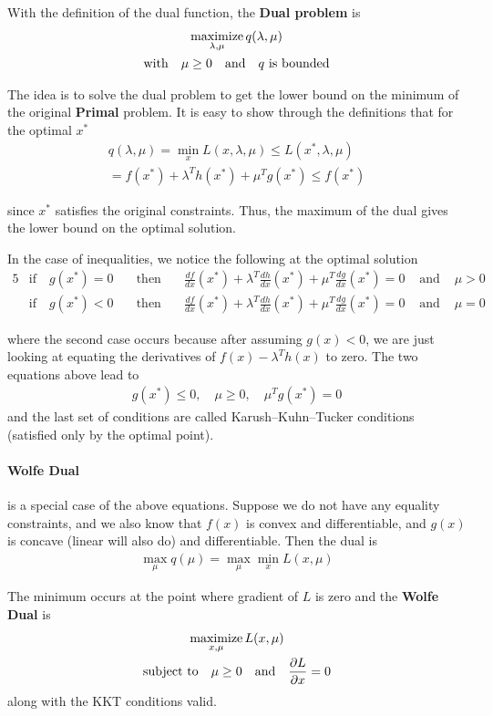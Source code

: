 \documentclass[../../statistical_learning_notes.tex]{subfiles}
\begin{document}
With the definition of the dual function, the \textbf{Dual problem} is
\begin{gather*}
    \operatorname*{maximize}_{\lambda, \mu} q(\lambda, \mu)\\
    \text{with} \quad \mu \geq 0 \quad \text{and} \quad q \text{ is bounded}
\end{gather*}

The idea is to solve the dual problem to get the lower bound on the minimum of the original \textbf{Primal} problem. It is easy to show through the definitions that for the optimal $x^{*}$
\begin{align*}
    q(\lambda, \mu) = \min_{x} L(x, \lambda, \mu) \leq L(x^{*}, \lambda, \mu)\\
    = f(x^{*}) + \lambda^{T}h(x^{*}) + \mu^{T}g(x^{*}) \leq f(x^{*})
\end{align*}

since $x^{*}$ satisfies the original constraints. Thus, the maximum of the dual gives the lower bound on the optimal solution.\newline

In the case of inequalities, we notice the following at the optimal solution
\begin{alignat*}{5}
    &\text{if} \quad g(x^{*}) = 0 \quad &\text{then} \quad &\frac{df}{dx}(x^{*}) +\lambda^{T} \frac{dh}{dx}(x^{*}) + \mu^{T} \frac{dg}{dx}(x^{*}) = 0 &\text{ and } &\mu > 0\\
    &\text{if} \quad g(x^{*}) < 0 \quad &\text{then} \quad &\frac{df}{dx}(x^{*}) +\lambda^{T} \frac{dh}{dx}(x^{*}) + \mu^{T} \frac{dg}{dx}(x^{*}) = 0 &\text{ and } &\mu = 0
\end{alignat*}

where the second case occurs because after assuming $g(x) < 0$, we are just looking at equating the derivatives of $f(x) - \lambda^{T}h(x)$ to zero. The two equations above lead to
\begin{align*}
    g(x^{*}) \leq 0, \quad \mu \geq 0, \quad \mu^{T}g(x^{*}) = 0
\end{align*}
and the last set of conditions are called Karush–Kuhn–Tucker conditions (satisfied only by the optimal point).

\paragraph{Wolfe Dual} is a special case of the above equations. Suppose we do not have any equality constraints, and we also know that $f(x)$ is convex and differentiable, and $g(x)$ is concave (linear will also do) and differentiable. Then the dual is
\begin{align*}
     \max_{\mu} q(\mu) = \max_{\mu} \min_{x} L(x, \mu)
\end{align*}

The minimum occurs at the point where gradient of $L$ is zero and the \textbf{Wolfe Dual} is
\begin{gather*}
    \operatorname*{maximize}_{x, \mu} L(x, \mu)\\
    \text{subject to} \quad \mu \geq 0 \quad \text{and} \quad \frac{\partial L}{\partial x}=0
\end{gather*}
along with the KKT conditions valid.
\end{document}
